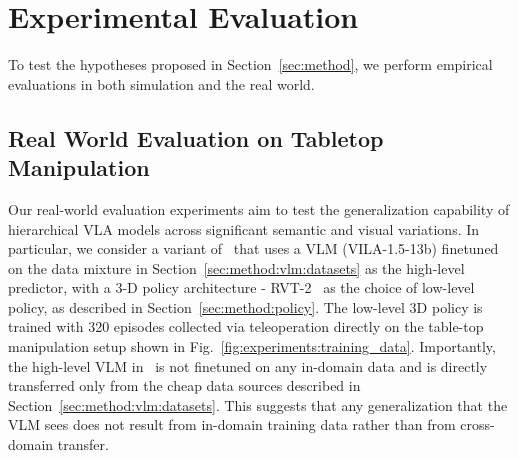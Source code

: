 \section{Experimental Evaluation}


To test the hypotheses proposed in Section~\ref{sec:method}, we perform empirical evaluations in both simulation and the real world. %


\subsection{Real World Evaluation on Tabletop Manipulation}

Our real-world evaluation experiments aim to test the generalization capability of hierarchical VLA models across significant semantic and visual variations. In particular, we consider a variant of \method\ that uses a VLM (VILA-1.5-13b) finetuned on the data mixture in Section~\ref{sec:method:vlm:datasets} as the high-level predictor, with a 3-D policy architecture - RVT-2~\citep{goyal2024rvt} as the choice of low-level policy, as described in Section~\ref{sec:method:policy}. The low-level 3D policy is trained with 320 episodes collected via teleoperation directly on the table-top manipulation setup shown in Fig.~\ref{fig:experiments:training_data}. Importantly, the high-level VLM in \method\ is not finetuned on any in-domain data and is directly transferred only from the cheap data sources described in Section~\ref{sec:method:vlm:datasets}. This suggests that any generalization that the VLM sees does not result from in-domain training data rather than from cross-domain transfer. 

